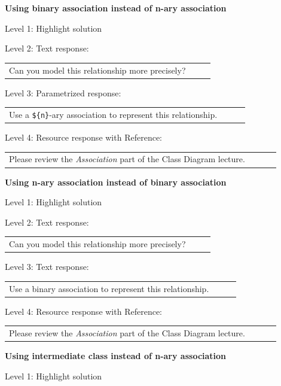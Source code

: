\noindent \textbf{Using binary association instead of n-ary association} \medskip

\noindent Level 1: Highlight solution  \medskip

\noindent Level 2: Text response: \medskip

\begin{tabular}{|p{0.9\linewidth}}
Can you model this relationship more precisely?
\end{tabular} \medskip

\noindent Level 3: Parametrized response: \medskip

\begin{tabular}{|p{0.9\linewidth}}
Use a \verb|${n}|-ary association to represent this relationship.
\end{tabular} \medskip

\noindent Level 4: Resource response with Reference: \medskip

\begin{tabular}{|p{0.9\linewidth}}
Please review the \textit{Association} part of the Class Diagram lecture.
\end{tabular} \medskip


\noindent \textbf{Using n-ary association instead of binary association} \medskip

\noindent Level 1: Highlight solution  \medskip

\noindent Level 2: Text response: \medskip

\begin{tabular}{|p{0.9\linewidth}}
Can you model this relationship more precisely?
\end{tabular} \medskip

\noindent Level 3: Text response: \medskip

\begin{tabular}{|p{0.9\linewidth}}
Use a binary association to represent this relationship.
\end{tabular} \medskip

\noindent Level 4: Resource response with Reference: \medskip

\begin{tabular}{|p{0.9\linewidth}}
Please review the \textit{Association} part of the Class Diagram lecture.
\end{tabular} \medskip


\noindent \textbf{Using intermediate class instead of n-ary association} \medskip

\noindent Level 1: Highlight solution  \medskip

